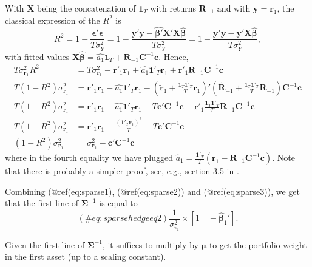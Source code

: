 With $\mathbf{X}$ being the concatenation of $\mathbf{1}_T$ with returns $\mathbf{R}_{ -1}$ and with $\mathbf{y}=\mathbf{r}_1$, the classical expression of the $R^2$ is
\begin{equation}
R^2=1-\frac{\mathbf{\epsilon}'\mathbf{\epsilon}}{T\sigma_Y^2}=1-\frac{\mathbf{y}'\mathbf{y}-\hat{\mathbf{\beta}'}\mathbf{X}'\mathbf{X}\hat{\mathbf{\beta}}}{T\sigma_Y^2}=1-\frac{\mathbf{y}'\mathbf{y}-\mathbf{y}'\mathbf{X}\hat{\mathbf{\beta}}}{T\sigma_Y^2},
\end{equation}
with fitted values $\mathbf{X}\hat{\mathbf{\beta}}= \hat{a_1}\mathbf{1}_T+\mathbf{R}_{ -1}\mathbf{C}^{ -1}\mathbf{c}$. Hence,
\begin{align*}
T\sigma_{\mathbf{r}_1}^2R^2&=T\sigma_{\mathbf{r}_1}^2-\mathbf{r}'_1\mathbf{r}_1+\hat{a_1}\mathbf{1}'_T\mathbf{r}_1+\mathbf{r}'_1\mathbf{R}_{-1}\mathbf{C}^{-1}\mathbf{c} \\
T(1-R^2)\sigma_{\mathbf{r}_1}^2&=\mathbf{r}'_1\mathbf{r}_1-\hat{a_1}\mathbf{1}'_T\mathbf{r}_1-\left(\mathbf{\tilde{r}}_1+\frac{\mathbf{1}_T\mathbf{1}'_T}{T}\mathbf{r}_1\right)'\left(\tilde{\mathbf{R}}_{-1}+\frac{\mathbf{1}_T\mathbf{1}'_T}{T}\mathbf{R}_{-1}\right)\mathbf{C}^{-1}\mathbf{c} \\
T(1-R^2)\sigma_{\mathbf{r}_1}^2&=\mathbf{r}'_1\mathbf{r}_1-\hat{a_1}\mathbf{1}'_T\mathbf{r}_1-T\mathbf{c}'\mathbf{C}^{-1}\mathbf{c} -\mathbf{r}'_1\frac{\mathbf{1}_T\mathbf{1}'_T}{T}\mathbf{R}_{-1} \mathbf{C}^{-1}\mathbf{c} \\
T(1-R^2)\sigma_{\mathbf{r}_1}^2&=\mathbf{r}'_1\mathbf{r}_1-\frac{(\mathbf{1}'_T\mathbf{r}_1)^2}{T}- T\mathbf{c}'\mathbf{C}^{-1}\mathbf{c} \\
(1-R^2)\sigma_{\mathbf{r}_1}^2&=\sigma_{\mathbf{r}_1}^2- \mathbf{c}'\mathbf{C}^{-1}\mathbf{c} 
\end{align*}
where in the fourth equality we have plugged $\hat{a}_1=\frac{\mathbf{1'}_T}{T}(\mathbf{r}_1 -\mathbf{R}_{ -1}\mathbf{C}^{ -1}\mathbf{c})$. Note that there is probably a simpler proof, see, e.g., section 3.5 in \cite{greene2018econometric}.

Combining (@ref(eq:sparse1), (@ref(eq:sparse2)) and (@ref(eq:sparse3)), we get that the first line of $\mathbf{\Sigma}^{ -1}$ is equal to
\begin{equation}
(\#eq:sparsehedgeeq2)
\frac{1}{\sigma^2_{\epsilon_1}}\times \left[ 1 \quad  -\hat{\boldsymbol{\beta}}_1'\right].
\end{equation}

Given the first line of $\mathbf{\Sigma}^{ -1}$, it suffices to multiply by $\boldsymbol{\mu}$ to get the portfolio weight in the first asset (up to a scaling constant).

